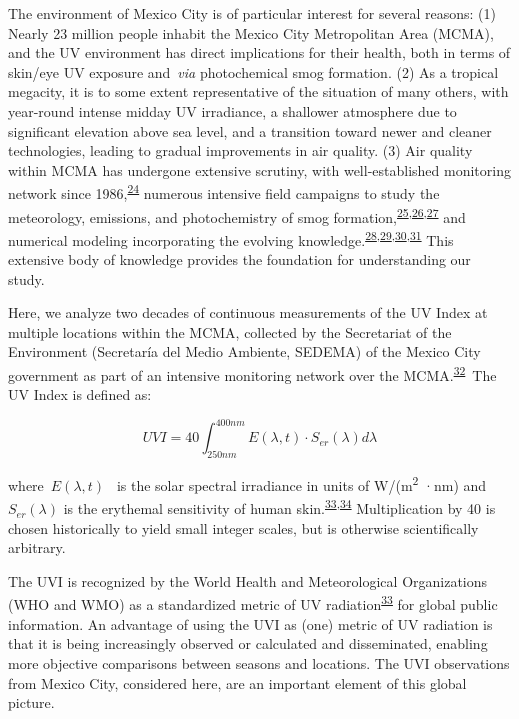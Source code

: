 \documentclass[10pt]{article}
\begin{document}
The environment of Mexico City is of particular interest for several
reasons: (1) Nearly 23 million people inhabit the Mexico City
Metropolitan Area (MCMA), and the UV environment has direct implications
for their health, both in terms of skin/eye UV exposure and~\emph{via}
photochemical smog formation. (2) As a tropical megacity, it is to some
extent representative of the situation of many others, with year-round
intense midday UV irradiance, a shallower atmosphere due to significant
elevation above sea level, and a transition toward newer and cleaner
technologies, leading to gradual improvements in air quality. (3) Air
quality within MCMA has undergone extensive scrutiny, with
well-established monitoring network since 1986,\textsuperscript{\hyperref[csl:24]{24}}
numerous intensive field campaigns to study the meteorology, emissions,
and photochemistry of smog formation,\textsuperscript{\hyperref[csl:25]{25},\hyperref[csl:26]{26},\hyperref[csl:27]{27}} and numerical
modeling incorporating the evolving knowledge.\textsuperscript{\hyperref[csl:28]{28},\hyperref[csl:29]{29},\hyperref[csl:30]{30},\hyperref[csl:31]{31}} This
extensive body of knowledge provides the foundation for understanding
our study.

Here, we analyze two decades of continuous measurements of the UV Index
at multiple locations within the MCMA, collected by the Secretariat of
the Environment (Secretaría del Medio Ambiente, SEDEMA) of the Mexico
City government as part of an intensive monitoring network over the
MCMA.\textsuperscript{\hyperref[csl:32]{32}}~The UV Index is defined as:

\begin{equation}
\label{eq:UVI}
UVI=40 \int_{250nm}^{400nm} E\left(\lambda,t\right) \cdot S_{er}(\lambda) d\lambda
\end{equation}

where~\(E(\lambda,t)\)\emph{~} is the solar spectral irradiance in
units of W/(m\textsuperscript{2} ·nm) and~\(S_{er}\left(\lambda\right)\) is the
erythemal sensitivity of human skin.\textsuperscript{\hyperref[csl:33]{33},\hyperref[csl:34]{34}} Multiplication by
40 is chosen historically to yield small integer scales, but is
otherwise scientifically arbitrary.

The UVI is recognized by the World Health and Meteorological
Organizations (WHO and WMO) as a standardized metric of UV
radiation\textsuperscript{\hyperref[csl:33]{33}} for global public information. An advantage
of using the UVI as (one) metric of UV radiation is that it is being
increasingly observed or calculated and disseminated, enabling more
objective comparisons between seasons and locations. The UVI
observations from Mexico City, considered here, are an important element
of this global picture. ~
\end{document}
